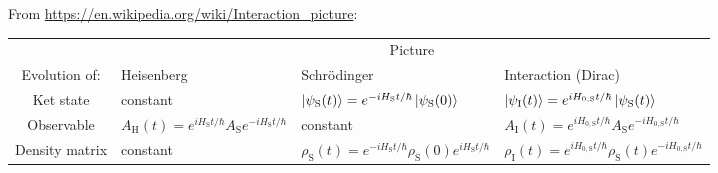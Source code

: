 \documentclass{article}
\begin{document}
From \url{https://en.wikipedia.org/wiki/Interaction_picture}:
\begin{table}[htpb]
  \centering
  \begin{tabular}{clll}
    \toprule
    & \multicolumn{3}{c}{Picture} \\
    \cmidrule{2-4}
    Evolution of: & Heisenberg & Schr{\"{o}}dinger & Interaction (Dirac) \\
    \midrule
    Ket state & constant & \(\ket{\psi_{\mathrm{S}}(t)} = e^{-iH_{\mathrm{S}}t/\hbar} \ket{\psi_{\mathrm{S}}(0)}\) & \(\ket{\psi_{\mathrm{I}}(t)} = e^{iH_{0,\mathrm{S}}t/\hbar} \ket{\psi_{\mathrm{S}}(t)}\) \\
    Observable & \(A_{\mathrm{H}}(t) = e^{iH_{\mathrm{S}}t/\hbar} A_{\mathrm{S}} e^{-iH_{\mathrm{S}}t/\hbar}\) & constant & \(A_{\mathrm{I}}(t) = e^{iH_{0,\mathrm{S}}t/\hbar} A_{\mathrm{S}} e^{-iH_{0,\mathrm{S}}t/\hbar}\) \\
    Density matrix & constant & \(\rho_{\mathrm{S}}(t) = e^{-iH_{\mathrm{S}}t/\hbar} \rho_{\mathrm{S}}(0) e^{iH_{\mathrm{S}}t/\hbar}\) & \(\rho_{\mathrm{I}}(t) = e^{iH_{0,\mathrm{S}}t/\hbar} \rho_{\mathrm{S}}(t) e^{-iH_{0,\mathrm{S}}t/\hbar}\) \\
    \bottomrule
  \end{tabular}
\end{table}
\end{document}
